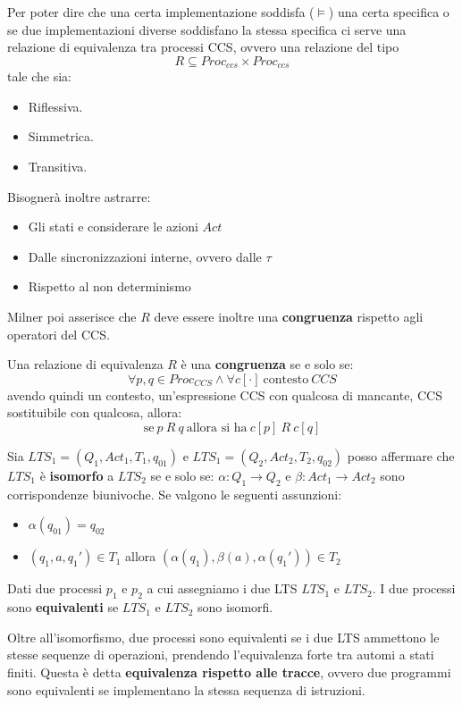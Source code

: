 Per poter dire che una certa implementazione soddisfa ($\models$) una certa
specifica o se due implementazioni diverse soddisfano la stessa specifica ci
serve una relazione di equivalenza tra processi CCS, ovvero una relazione del
tipo $$R \subseteq Proc_{ccs} \times Proc_{ccs}$$ tale che sia:
\begin{itemize}
    \item Riflessiva.
    \item Simmetrica.
    \item Transitiva.
\end{itemize}
Bisognerà inoltre astrarre:
\begin{itemize}
    \item Gli stati e considerare le azioni $Act$
    \item Dalle sincronizzazioni interne, ovvero dalle $\tau$
    \item Rispetto al non determinismo
\end{itemize}
Milner poi asserisce che $R$ deve essere inoltre una \textbf{congruenza} rispetto
agli operatori del CCS.
\begin{definizione}
    Una relazione di equivalenza $R$ è una \textbf{congruenza} se e solo se:
    $$\forall p, q \in Proc_{CCS} \land \forall c[\cdot] \ \text{contesto} \ CCS $$
    avendo quindi un contesto, un’espressione CCS con qualcosa di mancante, CCS
    sostituibile con qualcosa, allora: $$ \text{se} \ p\ R\ q \ \text{allora si ha} \ c[p] \ R \ c[q]$$
\end{definizione}
Sia $LTS_1 = (Q_1, Act_1, T_1, q_{01})$ e $LTS_1 = (Q_2, Act_2, T_2, q_{02})$
posso affermare che $LTS_1$ è \textbf{isomorfo} a $LTS_2$ se e solo se:
$\alpha: Q_1 \to Q_2$ e $\beta: Act_1 \to Act_2$ sono corrispondenze biunivoche.
Se valgono le seguenti assunzioni:
\begin{itemize}
    \item $\alpha(q_{01}) = q_{02}$
    \item $(q_1, a, q_1') \in T_1$ allora $(\alpha(q_1), \beta(a), \alpha(q_1')) \in T_2$
\end{itemize}
\begin{teorema}
    Dati due processi $p_1$ e $p_2$ a cui assegniamo i due LTS $LTS_1$ e $LTS_2$.
    I due processi sono \textbf{equivalenti} se $LTS_1$ e $LTS_2$ sono isomorfi.
\end{teorema}
Oltre all'isomorfismo, due processi sono equivalenti se i due LTS ammettono le
stesse sequenze di operazioni, prendendo l'equivalenza forte tra automi a stati
finiti. Questa è detta \textbf{equivalenza rispetto alle tracce}, ovvero due
programmi sono equivalenti se implementano la stessa sequenza di istruzioni.

